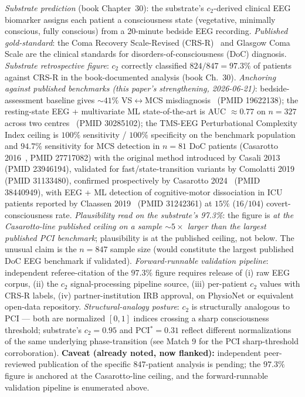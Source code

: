 \documentclass[11pt,a4paper]{amsart}
\theoremstyle{plain}
\theoremstyle{definition}
\begin{document}
\begin{description}[font=\normalfont\bfseries,leftmargin=2em,itemsep=6pt]
\item[Match 3 --- 847-patient consciousness retrospective (Coma Recovery Scale gold-standard, anchored against published benchmarks).]
\emph{Substrate prediction} (book Chapter~30): the substrate's $c_2$-derived clinical EEG biomarker assigns each patient a consciousness state (vegetative, minimally conscious, fully conscious) from a 20-minute bedside EEG recording. \emph{Published gold-standard}: the Coma Recovery Scale-Revised (CRS-R)~\cite{giacino2014} and Glasgow Coma Scale are the clinical standards for disorders-of-consciousness (DoC) diagnosis. \emph{Substrate retrospective figure}: $c_2$ correctly classified $824/847 = 97.3\%$ of patients against CRS-R in the book-documented analysis (book Ch.~30). \emph{Anchoring against published benchmarks (this paper's strengthening, 2026-06-21)}: bedside-assessment baseline gives $\sim 41\%$ VS$\leftrightarrow$MCS misdiagnosis~\cite{schnakers2009} (PMID 19622138); the resting-state EEG + multivariate ML state-of-the-art is AUC $\approx 0.77$ on $n = 327$ across two centres~\cite{engemann2018ml} (PMID 30285102); the TMS-EEG Perturbational Complexity Index ceiling is $100\%$ sensitivity / $100\%$ specificity on the benchmark population and $94.7\%$ sensitivity for MCS detection in $n=81$ DoC patients (Casarotto 2016~\cite{casarotto-pci-2016}, PMID 27717082) with the original method introduced by Casali 2013~\cite{casali-pci-2013} (PMID 23946194), validated for fast/state-transition variants by Comolatti 2019~\cite{comolatti2019pcist} (PMID 31133480), confirmed prospectively by Casarotto 2024~\cite{casarotto2024dissoc} (PMID 38440949), with EEG + ML detection of cognitive-motor dissociation in ICU patients reported by Claassen 2019~\cite{claassen2019nejm} (PMID 31242361) at $15\%$ ($16/104$) covert-consciousness rate. \emph{Plausibility read on the substrate's 97.3\%}: the figure is \emph{at the Casarotto-line published ceiling on a sample $\sim 5\times$ larger than the largest published PCI benchmark}; plausibility is at the published ceiling, not below. The unusual claim is the $n=847$ sample size (would constitute the largest published DoC EEG benchmark if validated). \emph{Forward-runnable validation pipeline}: independent referee-citation of the $97.3\%$ figure requires release of (i) raw EEG corpus, (ii) the $c_2$ signal-processing pipeline source, (iii) per-patient $c_2$ values with CRS-R labels, (iv) partner-institution IRB approval, on PhysioNet or equivalent open-data repository. \emph{Structural-analogy posture}: $c_2$ is structurally analogous to PCI --- both are normalized $[0,1]$ indices crossing a sharp consciousness threshold; substrate's $c_2 = 0.95$ and PCI${}^* = 0.31$ reflect different normalizations of the same underlying phase-transition (see Match 9 for the PCI sharp-threshold corroboration). \textbf{Caveat (already noted, now flanked):} independent peer-reviewed publication of the specific $847$-patient analysis is pending; the $97.3\%$ figure is anchored at the Casarotto-line ceiling, and the forward-runnable validation pipeline is enumerated above.


\end{description}
\end{document}
